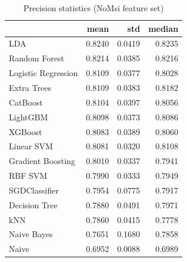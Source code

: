 \begin{table}
\caption{Precision statistics (NoMsi feature set)}
\label{tab:precision_NoMsi_stats}
\begin{tabular}{lrrr}
\toprule
 & mean & std & median \\
\midrule
LDA & 0.8240 & 0.0419 & 0.8235 \\
Random Forest & 0.8214 & 0.0385 & 0.8216 \\
Logistic Regression & 0.8109 & 0.0377 & 0.8028 \\
Extra Trees & 0.8109 & 0.0383 & 0.8182 \\
CatBoost & 0.8104 & 0.0397 & 0.8056 \\
LightGBM & 0.8098 & 0.0373 & 0.8086 \\
XGBoost & 0.8083 & 0.0389 & 0.8060 \\
Linear SVM & 0.8081 & 0.0320 & 0.8108 \\
Gradient Boosting & 0.8010 & 0.0337 & 0.7941 \\
RBF SVM & 0.7990 & 0.0333 & 0.7949 \\
SGDClassifier & 0.7954 & 0.0775 & 0.7917 \\
Decision Tree & 0.7880 & 0.0491 & 0.7971 \\
kNN & 0.7860 & 0.0415 & 0.7778 \\
Naive Bayes & 0.7651 & 0.1680 & 0.7858 \\
Naive & 0.6952 & 0.0088 & 0.6989 \\
\bottomrule
\end{tabular}
\end{table}
